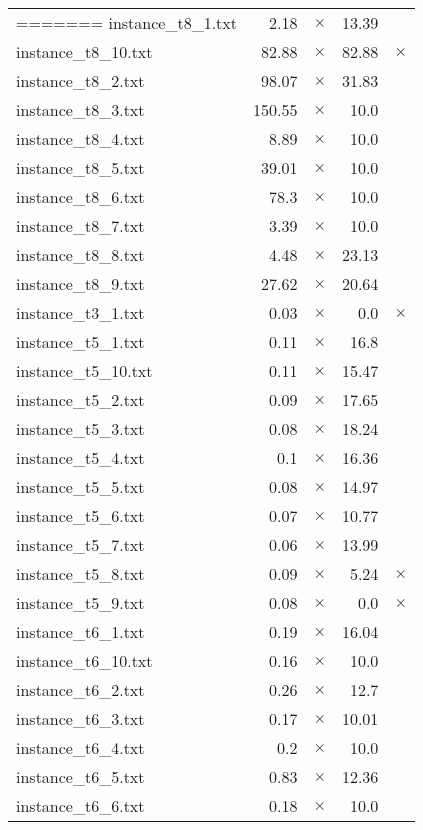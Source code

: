 \documentclass{article}
\begin{document}
\begin{center}
\begin{tabular}{lrrrr}
=======
instance\_t8\_1.txt & 2.18 & 
$\times$
 & 13.39 & 
\\
instance\_t8\_10.txt & 82.88 & 
$\times$
 & 82.88 & 
$\times$
\\
instance\_t8\_2.txt & 98.07 & 
$\times$
 & 31.83 & 
\\
instance\_t8\_3.txt & 150.55 & 
$\times$
 & 10.0 & 
\\
instance\_t8\_4.txt & 8.89 & 
$\times$
 & 10.0 & 
\\
instance\_t8\_5.txt & 39.01 & 
$\times$
 & 10.0 & 
\\
instance\_t8\_6.txt & 78.3 & 
$\times$
 & 10.0 & 
\\
instance\_t8\_7.txt & 3.39 & 
$\times$
 & 10.0 & 
\\
instance\_t8\_8.txt & 4.48 & 
$\times$
 & 23.13 & 
\\
instance\_t8\_9.txt & 27.62 & 
$\times$
 & 20.64 & 
\\
instance\_t3\_1.txt & 0.03 & 
$\times$
 & 0.0 & 
$\times$
\\
instance\_t5\_1.txt & 0.11 & 
$\times$
 & 16.8 & 
\\
instance\_t5\_10.txt & 0.11 & 
$\times$
 & 15.47 & 
\\
instance\_t5\_2.txt & 0.09 & 
$\times$
 & 17.65 & 
\\
instance\_t5\_3.txt & 0.08 & 
$\times$
 & 18.24 & 
\\
instance\_t5\_4.txt & 0.1 & 
$\times$
 & 16.36 & 
\\
instance\_t5\_5.txt & 0.08 & 
$\times$
 & 14.97 & 
\\
instance\_t5\_6.txt & 0.07 & 
$\times$
 & 10.77 & 
\\
instance\_t5\_7.txt & 0.06 & 
$\times$
 & 13.99 & 
\\
instance\_t5\_8.txt & 0.09 & 
$\times$
 & 5.24 & 
$\times$
\\
instance\_t5\_9.txt & 0.08 & 
$\times$
 & 0.0 & 
$\times$
\\
instance\_t6\_1.txt & 0.19 & 
$\times$
 & 16.04 & 
\\
instance\_t6\_10.txt & 0.16 & 
$\times$
 & 10.0 & 
\\
instance\_t6\_2.txt & 0.26 & 
$\times$
 & 12.7 & 
\\
instance\_t6\_3.txt & 0.17 & 
$\times$
 & 10.01 & 
\\
instance\_t6\_4.txt & 0.2 & 
$\times$
 & 10.0 & 
\\
instance\_t6\_5.txt & 0.83 & 
$\times$
 & 12.36 & 
\\
instance\_t6\_6.txt & 0.18 & 
$\times$
 & 10.0 & 
\\
\hline\end{tabular}
\end{center}
\end{document}

